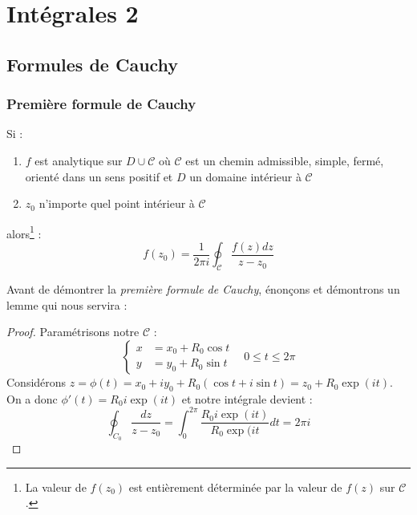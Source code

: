 \chapter{Intégrales 2}
\section{Formules de Cauchy}
\subsection{Première formule de Cauchy}
Si :
\begin{enumerate}
	\item $f$ est analytique sur $D \cup \mathcal{C}$ où $\mathcal{C}$ est un chemin admissible,
	      simple, fermé, orienté dans un sens positif et $D$ un domaine intérieur à $\mathcal{C}$
	\item $z_0$ n'importe quel point intérieur à $\mathcal{C}$
\end{enumerate}
alors\footnote{La valeur de $f(z_0)$ est entièrement déterminée par la valeur de $f(z)$ sur
	$\mathcal{C}$.} :
\begin{equation}
	f(z_0) = \dfrac{1}{2\pi i}\oint_\mathcal{C}\dfrac{f(z)dz}{z-z_0}
\end{equation}
    
Avant de démontrer la \textit{première formule de Cauchy}, énonçons et démontrons un lemme
qui nous servira :\\
    
\begin{proof}
	Paramétrisons notre $\mathcal{C}$ :
	\begin{equation}
		\left\{\begin{array}{ll}
		x &= x_0 + R_0\cos t  \\
		y &= y_0 + R_0\sin t 
		\end{array}\right.\ \ \ \ 0 \leq t \leq 2\pi
	\end{equation}
	Considérons $z = \phi(t) = x_0 + iy_0 + R_0(\cos t + i \sin t) = z_0 + R_0\exp(it)$. On a
	donc $\phi'(t) = R_0 i\exp(it)$ et notre intégrale devient :
	\begin{equation}
		\oint_{C_0} \dfrac{dz}{z-z_0} = \int_0^{2\pi} \dfrac{R_0 i \exp(it)}{R_0\exp(it}dt = 2\pi i
	\end{equation}
\end{proof}

